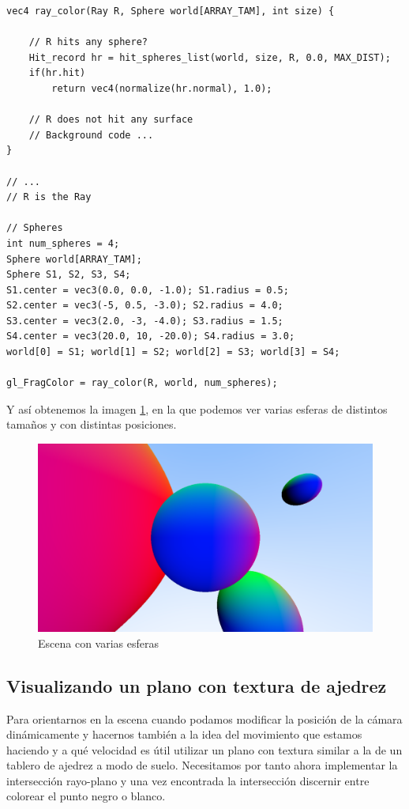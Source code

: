 \begin{lstlisting}
vec4 ray_color(Ray R, Sphere world[ARRAY_TAM], int size) {

    // R hits any sphere?
    Hit_record hr = hit_spheres_list(world, size, R, 0.0, MAX_DIST);
    if(hr.hit)
        return vec4(normalize(hr.normal), 1.0);

    // R does not hit any surface
    // Background code ... 
}

// ... 
// R is the Ray

// Spheres
int num_spheres = 4;
Sphere world[ARRAY_TAM];
Sphere S1, S2, S3, S4;
S1.center = vec3(0.0, 0.0, -1.0); S1.radius = 0.5; 
S2.center = vec3(-5, 0.5, -3.0); S2.radius = 4.0;
S3.center = vec3(2.0, -3, -4.0); S3.radius = 1.5;
S4.center = vec3(20.0, 10, -20.0); S4.radius = 3.0;
world[0] = S1; world[1] = S2; world[2] = S3; world[3] = S4;

gl_FragColor = ray_color(R, world, num_spheres);

\end{lstlisting}

Y así obtenemos la imagen \ref{fig:varias-esferas}, en la que podemos ver varias esferas de distintos tamaños y con distintas posiciones.

\begin{figure} [ht]
    \centering
    \includegraphics[scale = 0.25]{img/C7/varias-esferas.png}
    \caption{Escena con varias esferas}
    \label{fig:varias-esferas}
\end{figure}

\subsection{Visualizando un plano con textura de ajedrez}
\label{subsection:plano}

Para orientarnos en la escena cuando podamos modificar la posición de la cámara dinámicamente y hacernos también a la idea del movimiento que estamos haciendo y a qué velocidad es útil utilizar un plano con textura similar a la de un tablero de ajedrez a modo de suelo. Necesitamos por tanto ahora implementar la intersección rayo-plano y una vez encontrada la intersección discernir entre colorear el punto negro o blanco.

